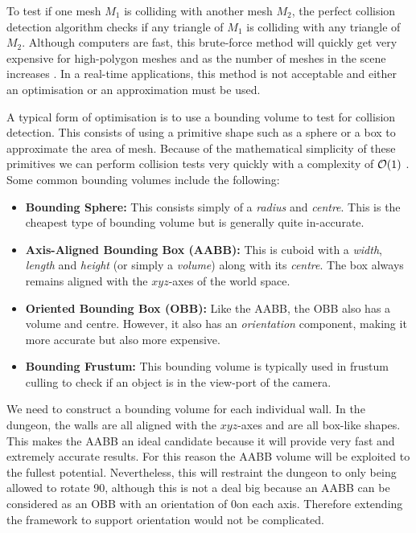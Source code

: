 To test if one mesh $M_1$ is colliding with another mesh $M_2$, the perfect collision detection algorithm checks if any triangle of $M_1$ is colliding with any triangle of $M_2$. Although computers are fast, this brute-force method will quickly get very expensive for high-polygon meshes and as the number of meshes in the scene increases \citep{BVH}. In a real-time applications, this method is not acceptable and either an optimisation or an approximation must be used.

A typical form of optimisation is to use a bounding volume to test for collision detection. This consists of using a primitive shape such as a sphere or a box to approximate the area of mesh. Because of the mathematical simplicity of these primitives we can perform collision tests very quickly with a complexity of $\mathcal{O} (1)$ \citep{BVH}. Some common bounding volumes include the following:
\begin{itemize}
\item {\bf Bounding Sphere:} This consists simply of a {\em radius} and {\em centre}. This is the cheapest type of bounding volume but is generally quite in-accurate.
\item {\bf Axis-Aligned Bounding Box (AABB):} This is cuboid with a {\em width}, {\em length} and {\em height} (or simply a {\em volume}) along with its {\em centre}. The box always remains aligned with the $xyz$-axes of the world space.
\item {\bf Oriented Bounding Box (OBB):} Like the AABB, the OBB also has a volume and centre. However, it also has an {\em orientation} component, making it more accurate but also more expensive.
\item {\bf Bounding Frustum:} This bounding volume is typically used in frustum culling to check if an object is in the view-port of the camera.
\end{itemize}

We need to construct a bounding volume for each individual wall. In the dungeon, the walls are all aligned with the $xyz$-axes and are all box-like shapes. This makes the AABB an ideal candidate because it will provide very fast and extremely accurate results. For this reason the AABB volume will be exploited to the fullest potential. Nevertheless, this will restraint the dungeon to only being allowed to rotate 90\degree, although this is not a deal big because an AABB can be considered as an OBB with an orientation of 0\degree on each axis. Therefore extending the framework to support orientation would not be complicated.

